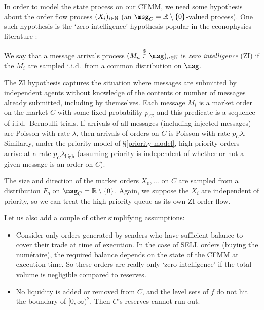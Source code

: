 \documentclass[a4paper,11pt]{article}
\begin{document}
In order to model the state process on our CFMM, we need some hypothesis about the order flow process $(X_i)_{i\in\mathbb N}$ (an $\msg_C = \R\setminus\{0\}$-valued process).
%
One such hypothesis is the `zero intelligence' hypothesis popular in the econophysics literature \cite{gode1993allocative, chakraborti2011econophysics}:

\begin{definition}
\label{zero-intelligence}

  We say that a message arrivals process $(M_n\stackrel{\$}{\in}\msg)_{n\in\N}$ is \emph{zero intelligence} (ZI) if the $M_i$ are sampled i.i.d.~from a common distribution on $\msg$.

\end{definition}

The ZI hypothesis captures the situation where messages are submitted by independent agents without knowledge of the contents or number of messages already submitted, including by themselves.
%
Each message $M_i$ is a market order on the market $C$ with some fixed probability $p_C$, and this predicate is a sequence of i.i.d.~Bernoulli trials.
%
If arrivals of all messages (including injected messages) are Poisson with rate $\lambda$, then arrivals of orders on $C$ is Poisson with rate $p_C\lambda$.
%
Similarly, under the priority model of \S\ref{priority-model}, high priority orders arrive at a rate $p_C\lambda_\mathrm{high}$ (assuming priority is independent of whether or not a given message is an order on $C$).

The size and direction of the market orders $X_0,\ldots$ on $C$ are sampled from a distribution $F_o$ on $\msg_C=\R\setminus\{0\}$.
%
Again, we suppose the $X_i$ are independent of priority, so we can treat the high priority queue as its own ZI order flow.

Let us also add a couple of other simplifying assumptions:
\begin{itemize}

  \item
    Consider only orders generated by senders who have sufficient balance to cover their trade at time of execution.
    In the case of SELL orders (buying the num\'eraire), the required balance depends on the state of the CFMM at execution time.
    So these orders are really only `zero-intelligence' if the total volume is negligible compared to reserves.
  
  \item
    No liquidity is added or removed from $C$, and the level sets of $f$ do not hit the boundary of $[0,\infty)^2$. Then $C$'s reserves cannot run out.

\end{itemize}
\end{document}
